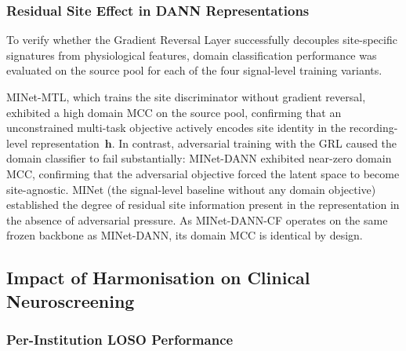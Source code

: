 \documentclass[preprint,12pt]{elsarticle}
\begin{document}
\subsubsection{Residual Site Effect in DANN Representations}
\label{subsub:residual_side_effects_dann}

To verify whether the Gradient Reversal Layer successfully decouples
site-specific signatures from physiological features, domain
classification performance was evaluated on the source pool for each
of the four signal-level training variants.

MINet-MTL, which trains the site discriminator without gradient
reversal, exhibited a high domain MCC on the source pool, confirming
that an unconstrained multi-task objective actively encodes site
identity in the recording-level representation~$\mathbf{h}$.
In contrast, adversarial training with the GRL caused the domain
classifier to fail substantially: MINet-DANN exhibited near-zero
domain MCC, confirming that the adversarial objective forced the
latent space to become site-agnostic.
MINet (the signal-level baseline without any domain objective)
established the degree of residual site information present in the
representation in the absence of adversarial pressure.
As MINet-DANN-CF operates on the same frozen backbone as MINet-DANN,
its domain MCC is identical by design.



\subsection{Impact of Harmonisation on Clinical Neuroscreening}
\label{subsec:clinical_results}

\subsubsection{Per-Institution LOSO Performance}
\end{document}
